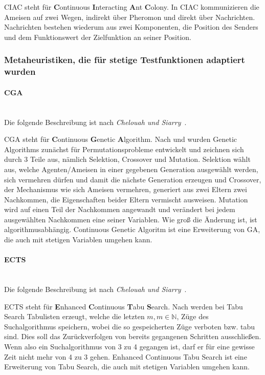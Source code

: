 \documentclass[fontsize=12, a4aper]{scrartcl}
\begin{document}
	CIAC steht für \textbf{C}ontinuous \textbf{I}nteracting \textbf{A}nt \textbf{C}olony. In CIAC kommunizieren die Ameisen auf zwei Wegen, indirekt über Pheromon und direkt über Nachrichten. Nachrichten bestehen wiederum aus zwei Komponenten, die Position des Senders und dem Funktionswert der Zielfunktion an seiner Position.
	
	\subsubsection{Metaheuristiken, die für stetige Testfunktionen adaptiert wurden} \label{subsubsec:Grundlagen:Vergleichsalgorithmen:Meta_-_Heuristiken_stetige_Probleme}
	
	\paragraph{CGA}\mbox{}\\
	
	Die folgende Beschreibung ist nach \textit{Chelouah und Siarry}~\cite{chelouah2000continuous}.\hfill\newline
	
	CGA steht für \textbf{C}ontinuous \textbf{G}enetic \textbf{A}lgorithm. Nach \cite{holland1962outline} und \cite{holand1975adaptation} wurden Genetic Algorithms zunächst für Permutationsprobleme entwickelt und zeichnen sich durch 3 Teile aus, nämlich Selektion, Crossover und Mutation. Selektion wählt aus, welche Agenten/Ameisen in einer gegebenen Generation ausgewählt werden, sich vermehren dürfen und damit die nächste Generation erzeugen und Crossover, der Mechanismus wie sich Ameisen vermehren, generiert aus zwei Eltern zwei Nachkommen, die Eigenschaften beider Eltern vermischt ausweisen. Mutation wird auf einen Teil der Nachkommen angewandt und verändert bei jedem ausgewählten Nachkommen eine seiner Variablen. Wie groß die Änderung ist, ist algorithmusabhängig. Continuous Genetic Algoritm ist eine Erweiterung von GA, die auch mit stetigen Variablen umgehen kann.
	
	\paragraph{ECTS}\mbox{}\\
	
	Die folgende Beschreibung ist nach \textit{Chelouah und Siarry}~\cite{chelouah1999enhanced}.\hfill\newline
	
	ECTS steht für \textbf{E}nhanced \textbf{C}ontinuous \textbf{T}abu \textbf{S}earch. Nach \cite{glover1986future} werden bei Tabu Search Tabulisten erzeugt, welche die letzten \(m, m \in \mathbb{N}\), Züge des Suchalgorithmus speichern, wobei die so gespeicherten Züge verboten bzw. tabu sind. Dies soll das Zurückverfolgen von bereits gegangenen Schritten ausschließen. Wenn also ein Suchalgorithmus von 3 zu 4 gegangen ist, darf er für eine gewisse Zeit nicht mehr von 4 zu 3 gehen. Enhanced Continuous Tabu Search ist eine Erweiterung von Tabu Search, die auch mit stetigen Variablen umgehen kann.
	
\end{document}
